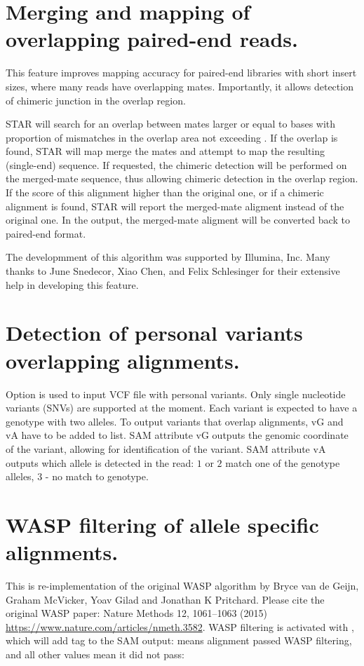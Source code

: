 \documentclass[12pt]{article}
\begin{document}
\section{Merging and mapping of overlapping paired-end reads.}
This feature improves mapping accuracy  for paired-end libraries with short insert sizes, where many reads have overlapping mates. Importantly, it allows detection of chimeric junction in the overlap region.

STAR will search for an overlap between mates larger or equal to  bases with proportion of mismatches in the overlap area not exceeding .
If the overlap is found, STAR will map merge the mates and attempt to map the resulting (single-end) sequence. 
If requested, the chimeric detection will be performed on the merged-mate sequence, thus allowing chimeric detection in the overlap region.
If the score of this alignment higher than the original one, or if a chimeric alignment is found, STAR will report the merged-mate aligment instead of the original one.
In the output, the merged-mate aligment will be converted back to paired-end format.

The developmment of this algorithm was supported by Illumina, Inc. 
Many thanks to June Snedecor, Xiao Chen, and Felix Schlesinger for their extensive help in developing this feature.

\section{Detection of personal variants overlapping alignments.}
Option   is used to input VCF file with personal variants. Only single nucleotide variants (SNVs) are supported at the moment. 
Each variant is expected to have a genotype with two alleles.
To output variants that overlap alignments, vG and vA have to be added to  list. 
SAM attribute vG outputs the genomic coordinate of the variant, allowing for identification of the variant.
SAM attribute vA outputs which allele is detected in the read: $1$ or $2$ match one of the genotype alleles, $3$ - no match to genotype.

\section{WASP filtering of allele specific alignments.} \label{section:WASP}
This is re-implementation of the original WASP algorithm by Bryce van de Geijn, Graham McVicker, Yoav Gilad and Jonathan K Pritchard. Please cite the original WASP paper: Nature Methods 12, 1061–1063 (2015) \url{https://www.nature.com/articles/nmeth.3582}.
WASP filtering is activated with  , which will add  tag to the SAM output:
 means alignment passed WASP filtering, and all other values mean it did not pass:
\end{document}
